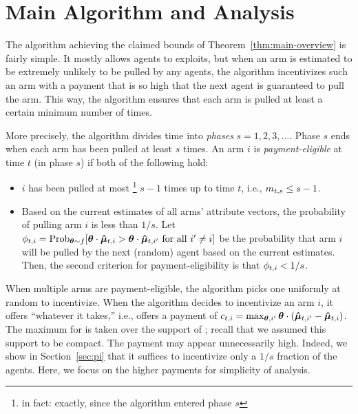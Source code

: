 
\newcommand{\e}{\mathrm{e}}
\providecommand{\Kth}[1]{\ensuremath{{#1}^{\rm th}}}

\def\QED{{\phantom{x}} \hfill \ensuremath{\rule{1.3ex}{1.3ex}}}

\newcommand{\extraproof}[1]{\rm \trivlist \item[\hskip \labelsep{\bf Proof of #1. }]}
\def\endextraproof{\QED \endtrivlist}

\def\emptyproof{\rm \trivlist \item[\hskip \labelsep{\bf Proof. }]}
\def\endemptyproof{\endtrivlist}

\section{Main Algorithm and Analysis}
\label{sec:ub}

The algorithm achieving the claimed bounds of
Theorem~\ref{thm:main-overview} is fairly simple.
It mostly allows agents to exploits, but when an arm is estimated to
be extremely unlikely to be pulled by any agents,
the algorithm incentivizes such an arm with a payment that is so high
that the next agent is guaranteed to pull the arm.
This way, the algorithm ensures that each arm is pulled at least a
certain minimum number of times.

More precisely, the algorithm divides time into \emph{phases}
$s = 1, 2, 3, \ldots$.
Phase $s$ ends when each arm has been pulled at least $s$ times.
An arm $i$ is \emph{payment-eligible} at time $t$ (in phase $s$)
if both of the following hold:

\begin{itemize}
\item $i$ has been pulled at most%
\footnote{in fact: exactly, since the algorithm entered phase $s$}
$s-1$ times up to time $t$, i.e., $m_{t,s} \leq s-1$.
\item Based on the current estimates  of all arms'
attribute vectors, the probability of pulling arm $i$ is less than $1/s$.
Let $\PullProb{t}{i} = \Prob[\AgV \sim \AgentDist]{\AgV \cdot \ArmEV{t}{i} > \AgV
  \cdot \ArmEV{t}{i'} \mbox{ for all } i' \neq i}$
be the probability that arm $i$ will be pulled
by the next (random) agent based on the current estimates. 
Then, the second criterion for payment-eligibility is that
$\phi_{t,i} < 1/s$.
\end{itemize}

When multiple arms are payment-eligible, the algorithm picks one
uniformly at random to incentivize.
When the algorithm decides to incentivize an arm $i$,
it offers ``whatever it takes,'' i.e., offers a payment of
$c_{t,i} = \max_{\bm{\theta},i'} \bm{\theta} \cdot (\bm{\hat{\mu}}_{t,i'} - \bm{\hat{\mu}}_{t,i})$.
The maximum for \AgV is taken over the support of \AgentDist;
recall that we assumed this support to be compact.
The payment  may appear unnecessarily high.
Indeed, we show in Section~\ref{sec:pi} that it suffices to
incentivize only a $1/s$ fraction of the agents.
Here, we focus on the higher payments for simplicity of analysis.

